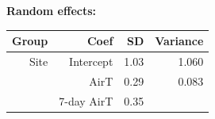 \documentclass[]{article}
\begin{document}
\textbf{Random effects:}

\begin{longtable}[c]{@{}rrrr@{}}
\toprule
\begin{minipage}[b]{0.10\columnwidth}\raggedleft\strut
Group
\strut\end{minipage} &
\begin{minipage}[b]{0.14\columnwidth}\raggedleft\strut
Coef
\strut\end{minipage} &
\begin{minipage}[b]{0.06\columnwidth}\raggedleft\strut
SD
\strut\end{minipage} &
\begin{minipage}[b]{0.12\columnwidth}\raggedleft\strut
Variance
\strut\end{minipage}\tabularnewline
\midrule
\endhead
\begin{minipage}[t]{0.10\columnwidth}\raggedleft\strut
Site
\strut\end{minipage} &
\begin{minipage}[t]{0.14\columnwidth}\raggedleft\strut
Intercept
\strut\end{minipage} &
\begin{minipage}[t]{0.06\columnwidth}\raggedleft\strut
1.03
\strut\end{minipage} &
\begin{minipage}[t]{0.12\columnwidth}\raggedleft\strut
1.060
\strut\end{minipage}\tabularnewline
\begin{minipage}[t]{0.10\columnwidth}\raggedleft\strut
\strut\end{minipage} &
\begin{minipage}[t]{0.14\columnwidth}\raggedleft\strut
AirT
\strut\end{minipage} &
\begin{minipage}[t]{0.06\columnwidth}\raggedleft\strut
0.29
\strut\end{minipage} &
\begin{minipage}[t]{0.12\columnwidth}\raggedleft\strut
0.083
\strut\end{minipage}\tabularnewline
\begin{minipage}[t]{0.10\columnwidth}\raggedleft\strut
\strut\end{minipage} &
\begin{minipage}[t]{0.14\columnwidth}\raggedleft\strut
7-day AirT
\strut\end{minipage} &
\begin{minipage}[t]{0.06\columnwidth}\raggedleft\strut
0.35
\strut\end{minipage} &

\end{longtable}
\end{document}
